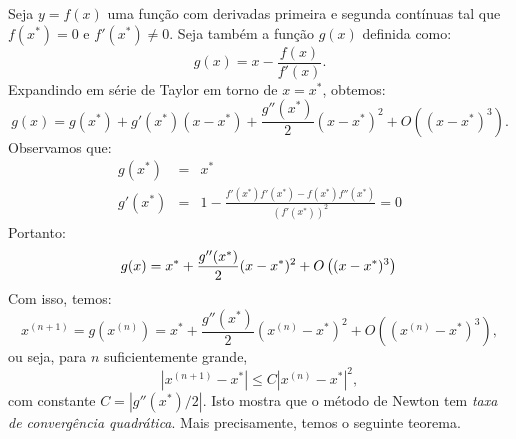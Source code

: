 \begin{ex}
Seja $y = f(x)$ uma função com derivadas primeira e segunda contínuas tal que $f(x^*)=0$ e $f'(x^*)\neq 0$. Seja também a função $g(x)$ definida como:
\begin{equation}
  g(x)=x-\frac{f(x)}{f'(x)}.
\end{equation}
Expandindo em série de Taylor em torno de $x = x^*$, obtemos:
\begin{equation}
  g(x)=g(x^*)+g'(x^*)(x-x^*) + \frac{g''(x^*)}{2}(x-x^*)^2 + O\left((x-x^*)^3\right).
\end{equation}
Observamos que:
\begin{eqnarray}
g(x^*) &=& x^*\\
g'(x^*) &=& 1 - \frac{f'(x^*)f'(x^*)-f(x^*)f''(x^*)}{\left(f'(x^*)\right)^2} = 0
\end{eqnarray}
Portanto:
\begin{equation}
g(x) = x^* + \frac{g''(x^*)}{2}(x-x^*)^2 + O\left((x-x^*)^3\right)\\
\end{equation}
Com isso, temos:
\begin{equation}
x^{(n+1)} = g(x^{(n)}) =  x^*+ \frac{g''(x^*)}{2}(x^{(n)}-x^*)^2 + O\left((x^{(n)}-x^*)^3\right),
\end{equation}
ou seja, para $n$ suficientemente grande,
\begin{equation}
\left|x^{(n+1)}-x^*\right| \leq C\left|x^{(n)}-x^*\right|^2,
\end{equation}
com constante $C = \left|g''(x^*)/2\right|$. Isto mostra que o método de Newton tem \emph{taxa de convergência quadrática}. Mais precisamente, temos o seguinte teorema.


\end{ex}
